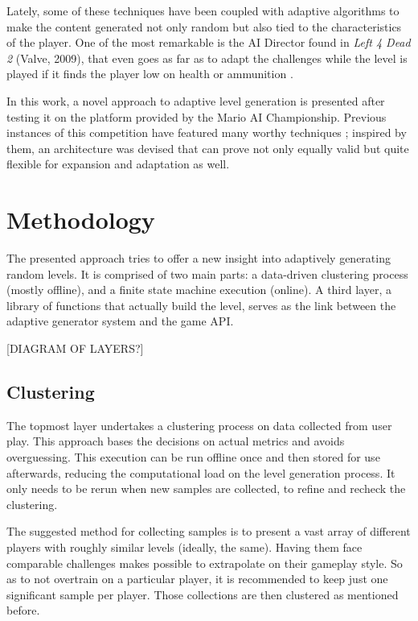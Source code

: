 \documentclass[conference]{IEEEtran}
\begin{document}
Lately, some of these techniques have been coupled with adaptive algorithms to make the content generated not only random but also tied to the characteristics of the player. One of the most remarkable is the AI Director found in \textit{Left 4 Dead 2} (Valve, 2009), that even goes as far as to adapt the challenges while the level is played if it finds the player low on health or ammunition \cite{l4d09}.

In this work, a novel approach to adaptive level generation is presented after testing it on the platform provided by the Mario AI Championship. Previous instances of this competition have featured many worthy techniques \cite{mario2010}; inspired by them, an architecture was devised that can prove not only equally valid but quite flexible for expansion and adaptation as well.

\section{Methodology}

The presented approach tries to offer a new insight into adaptively generating random levels. It is comprised of two main parts: a data-driven clustering process (mostly offline), and a finite state machine execution (online). A third layer, a library of functions that actually build the level, serves as the link between the adaptive generator system and the game API.

[DIAGRAM OF LAYERS?]

\subsection{Clustering}

The topmost layer undertakes a clustering process on data collected from user play. This approach bases the decisions on actual metrics and avoids overguessing. This execution can be run offline once and then stored for use afterwards, reducing the computational load on the level generation process. It only needs to be rerun when new samples are collected, to refine and recheck the clustering.

The suggested method for collecting samples is to present a vast array of different players with roughly similar levels (ideally, the same). Having them face comparable challenges makes possible to extrapolate on their gameplay style. So as to not overtrain on a particular player, it is recommended to keep just one significant sample per player. Those collections are then clustered as mentioned before.
\end{document}
